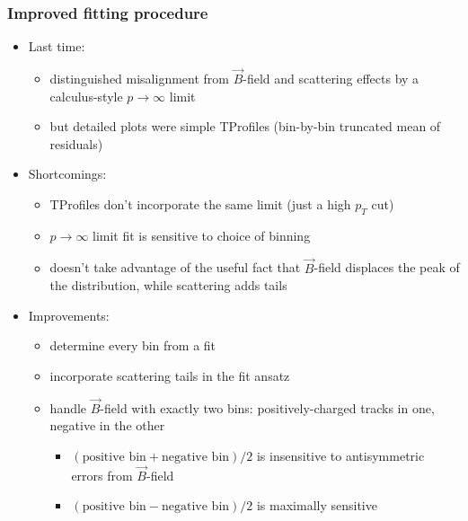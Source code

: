 \documentclass[compress]{beamer}
\begin{document}

\begin{frame}
\frametitle{Improved fitting procedure}
\begin{itemize}
\item Last time:
\begin{itemize}
\item distinguished misalignment from $\vec{B}$-field and scattering
  effects by a calculus-style $p \to \infty$ limit
\item but detailed plots were simple TProfiles (bin-by-bin truncated
  mean of residuals)
\end{itemize}

\item Shortcomings:
\begin{itemize}
\item TProfiles don't incorporate the same limit (just a high $p_T$ cut)
\item $p \to \infty$ limit fit is sensitive to choice of binning
\item doesn't take advantage of the useful fact that $\vec{B}$-field displaces
  the peak of the distribution, while scattering adds tails
\end{itemize}

\item Improvements:
\begin{itemize}
\item determine every bin from a fit
\item incorporate scattering tails in the fit ansatz
\item handle $\vec{B}$-field with exactly two bins: positively-charged
  tracks in one, negative in the other
\begin{itemize}
\item $(\mbox{positive bin} + \mbox{negative bin})/2$ is insensitive
  to antisymmetric errors from $\vec{B}$-field
\item $(\mbox{positive bin} - \mbox{negative bin})/2$ is maximally sensitive
\end{itemize}
\end{itemize}
\end{itemize}
\end{frame}
\end{document}
